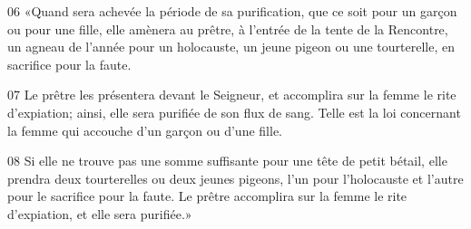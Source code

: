
06 «Quand sera achevée la période de sa purification, que ce soit pour un garçon ou pour une fille, elle amènera au prêtre, à l’entrée de la tente de la Rencontre, un agneau de l’année pour un holocauste, un jeune pigeon ou une tourterelle, en sacrifice pour la faute.

07 Le prêtre les présentera devant le Seigneur, et accomplira sur la femme le rite d’expiation; ainsi, elle sera purifiée de son flux de sang. Telle est la loi concernant la femme qui accouche d’un garçon ou d’une fille.

08 Si elle ne trouve pas une somme suffisante pour une tête de petit bétail, elle prendra deux tourterelles ou deux jeunes pigeons, l’un pour l’holocauste et l’autre pour le sacrifice pour la faute. Le prêtre accomplira sur la femme le rite d’expiation, et elle sera purifiée.»
